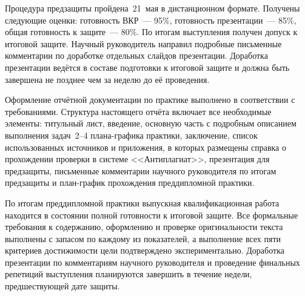 Процедура предзащиты пройдена~21~мая в дистанционном формате.
Получены следующие оценки: готовность ВКР~--- 95\%, готовность
презентации~--- 85\%, общая готовность к защите~--- 80\%. По
итогам выступления получен допуск к итоговой защите. Научный
руководитель направил подробные письменные комментарии по
доработке отдельных слайдов презентации. Доработка презентации
ведётся в составе подготовки к итоговой защите и должна быть
завершена не позднее чем за неделю до её проведения.

Оформление отчётной документации по практике выполнено в
соответствии с требованиями. Структура настоящего отчёта
включает все необходимые элементы: титульный лист, введение,
основную часть с подробным описанием выполнения задач~2--4
плана-графика практики, заключение, список использованных
источников и приложения, в которых размещены справка о
прохождении проверки в системе <<Антиплагиат>>, презентация для
предзащиты, письменные комментарии научного руководителя по
итогам предзащиты и план-график прохождения преддипломной
практики.

По итогам преддипломной практики выпускная квалификационная
работа находится в состоянии полной готовности к итоговой защите.
Все формальные требования к содержанию, оформлению и проверке
оригинальности текста выполнены с запасом по каждому из
показателей, а выполнение всех пяти критериев достижимости цели
подтверждено экспериментально. Доработка презентации по
комментариям научного руководителя и проведение финальных
репетиций выступления планируются завершить в течение недели,
предшествующей дате защиты.
